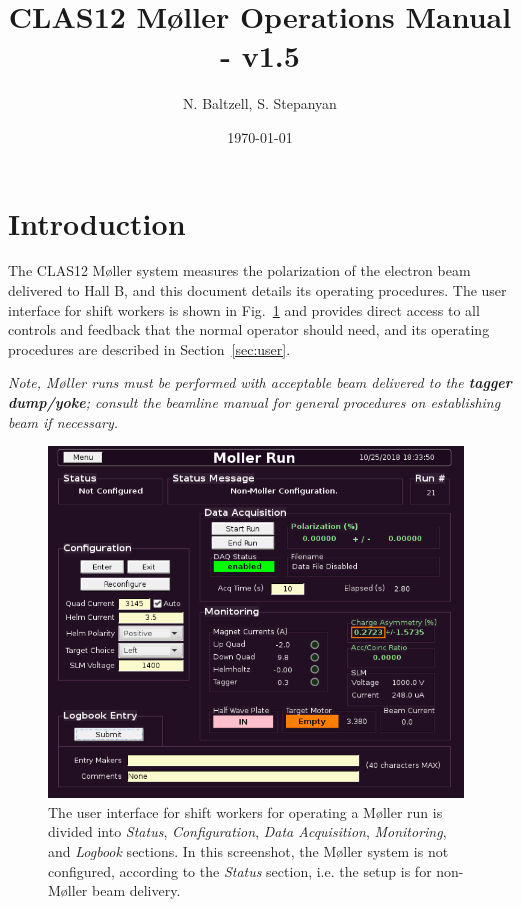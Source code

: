 \documentclass[amsmath,amssymb,notitlepage,12pt]{revtex4}
\begin{document}
\title{CLAS12 M{\o}ller Operations Manual - v1.5}
\date{\today}
\author{N. Baltzell, S. Stepanyan}
\begin{abstract}
\end{abstract}

\maketitle

\section{Introduction}
The CLAS12 M{\o}ller system measures the polarization of the electron beam delivered to Hall B, and this document details its operating procedures.  The user interface for shift workers is shown in Fig.~\ref{fig:unconfig} and provides direct access to all controls and feedback that the normal operator should need, and its operating procedures are described in Section~\ref{sec:user}.%

{\em \large Note, M{\o}ller runs must be performed with acceptable beam delivered to the {\bf tagger dump/yoke};  consult the beamline manual for general procedures on establishing beam if necessary.}

\begin{figure}[htbp]\centering
    \includegraphics[width=11cm]{pics/unconfig}
    \caption{The user interface for shift workers for operating a M{\o}ller run is divided into {\em Status}, {\em Configuration}, {\em Data Acquisition}, {\em Monitoring}, and {\em Logbook} sections.  In this screenshot, the M{\o}ller system is not configured, according to the {\em Status} section, i.e. the setup is for non-M{\o}ller beam delivery.\label{fig:unconfig}}
\end{figure}
\end{document}
